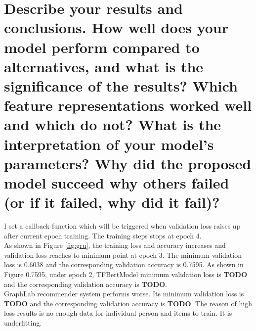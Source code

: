 \documentclass[12pt]{article}
\begin{document}
\section{Describe your results and conclusions. How well does your model perform compared to
alternatives, and what is the significance of the results? Which feature representations worked
well and which do not? What is the interpretation of your model’s parameters? Why did the
proposed model succeed why others failed (or if it failed, why did it fail)?}
I set a callback function which will be triggered when validation loss raises up after current epoch training.
The training steps stops at epoch 4.\\
As shown in Figure \ref{fig:gru}, the training loss and accuracy increases and validation loss reaches to minimum point at epoch 3. The minimum validation loss is 0.6038 and the corresponding validation accuracy is 0.7595.
As shown in Figure 0.7595, under epoch 2, TFBertModel minimum validation loss is \textbf{TODO} and the corresponding validation accuracy is \textbf{TODO}.\\
GraphLab recommender system performs worse. Its minimum validation loss is \textbf{TODO} and the corresponding validation accuracy is \textbf{TODO}. The reason of high loss results is no enough data for individual person
and items to train. It is underfitting.\\
\end{document}
